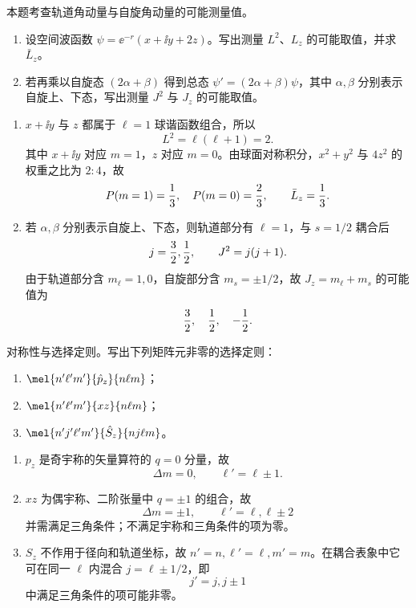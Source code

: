 
\begin{question}
本题考查轨道角动量与自旋角动量的可能测量值。
\begin{enumerate}
  \item 设空间波函数 $\psi=\ee^{-r}(x+\ii y+2z)$。写出测量 $L^2$、$L_z$ 的可能取值，并求 $\bar L_z$。
  \item 若再乘以自旋态 $(2\alpha+\beta)$ 得到总态 $\psi'=(2\alpha+\beta)\psi$，其中 $\alpha,\beta$ 分别表示自旋上、下态，写出测量 $J^2$ 与 $J_z$ 的可能取值。
\end{enumerate}
\begin{solution}
\begin{enumerate}
  \item $x+\ii y$ 与 $z$ 都属于 $\ell=1$ 球谐函数组合，所以
  \[
    L^2=\ell(\ell+1)=2.
  \]
  其中 $x+\ii y$ 对应 $m=1$，$z$ 对应 $m=0$。由球面对称积分，$x^2+y^2$ 与 $4z^2$ 的权重之比为 $2:4$，故
  \[
    P(m=1)={1\over3},\quad P(m=0)={2\over3},\qquad
    \bar L_z={1\over3}.
  \]
  \item 若 $\alpha,\beta$ 分别表示自旋上、下态，则轨道部分有 $\ell=1$，与 $s=1/2$ 耦合后
  \[
    j={3\over2},{1\over2},\qquad J^2=j(j+1).
  \]
  由于轨道部分含 $m_\ell=1,0$，自旋部分含 $m_s=\pm 1/2$，故 $J_z=m_\ell+m_s$ 的可能值为
  \[
    {3\over2},\quad {1\over2},\quad -{1\over2}.
  \]
\end{enumerate}
\end{solution}
\end{question}

\begin{question}
对称性与选择定则。写出下列矩阵元非零的选择定则：
\begin{enumerate}
  \item $\mel{n'\ell'm'}{\hat p_z}{n\ell m}$；
  \item $\mel{n'\ell'm'}{xz}{n\ell m}$；
  \item $\mel{n'j'\ell'm'}{\hat S_z}{nj\ell m}$。
\end{enumerate}
\begin{solution}
\begin{enumerate}
  \item $p_z$ 是奇宇称的矢量算符的 $q=0$ 分量，故
  \[
    \Delta m=0,
    \qquad \ell'=\ell\pm1.
  \]
  \item $xz$ 为偶宇称、二阶张量中 $q=\pm1$ 的组合，故
  \[
    \Delta m=\pm1,
    \qquad \ell'=\ell,\ell\pm2
  \]
  并需满足三角条件；不满足宇称和三角条件的项为零。
  \item $S_z$ 不作用于径向和轨道坐标，故 $n'=n,\ell'=\ell,m'=m$。在耦合表象中它可在同一 $\ell$ 内混合 $j=\ell\pm1/2$，即
  \[
    j'=j,j\pm1
  \]
  中满足三角条件的项可能非零。
\end{enumerate}
\end{solution}
\end{question}

